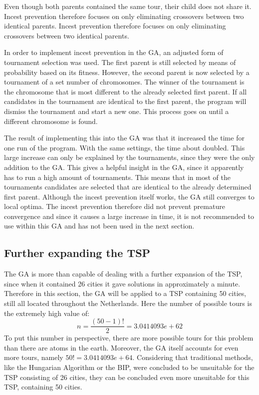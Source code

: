 Even though both parents contained the same tour, their child does not share it. Incest prevention therefore focuses on only eliminating crossovers between two identical parents. Incest prevention therefore focuses on only eliminating crossovers between two identical parents.

\par
In order to implement incest prevention in the GA, an adjusted form of tournament selection was used. The first parent is still selected by means of probability based on its fitness. However, the second parent is now selected by a tournament of a set number of chromosomes. The winner of the tournament is the chromosome that is most different to the already selected first parent. If all candidates in the tournament are identical to the first parent, the program will dismiss the tournament and start a new one. This process goes on until a different chromosome is found. 

\par
The result of implementing this into the GA was that it increased the time for one run of the program. With the same settings, the time about doubled. This large increase can only be explained by the tournaments, since they were the only addition to the GA. This gives a helpful insight in the GA, since it apparently has to run a high amount of tournaments. This means that in most of the tournaments candidates are selected that are identical to the already determined first parent. Although the incest prevention itself works, the GA still converges to local optima. The incest prevention therefore did not prevent premature convergence and since it causes a large increase in time, it is not recommended to use within this GA and has not been used in the next section. 

\subsection{Further expanding the TSP}
\par
The GA is more than capable of dealing with a further expansion of the TSP, since when it contained 26 cities it gave solutions in approximately a minute. Therefore in this section, the GA will be applied to a TSP containing 50 cities, still all located throughout the Netherlands. Here the number of possible tours is the extremely high value of:
\[n = \frac{(50-1)!}{2} = 3.0414093e+62\]
To put this number in perspective, there are more possible tours for this problem than there are atoms in the earth. Moreover, the GA itself accounts for even more tours, namely $50! = 3.0414093e+64$. Considering that traditional methods, like the Hungarian Algorithm or the BIP, were concluded to be unsuitable for the TSP consisting of 26 cities, they can be concluded even more unsuitable for this TSP, containing 50 cities.

